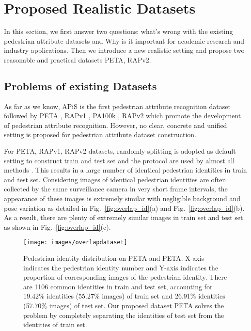 \documentclass[runningheads]{llncs}
\begin{document}
\section{Proposed Realistic Datasets} \label{dataset}

In this section, we first answer two questions: what's wrong with the existing pedestrian attribute datasets and Why is it important for academic research and industry applications. Then we introduce a new realistic setting and propose two reasonable and practical datasets PETA\textsubscript{}, RAPv2\textsubscript{}.

\subsection{Problems of existing Datasets}

As far as we know, APiS \cite{zhu2013pedestrian} is the first pedestrian attribute recognition dataset followed by PETA \cite{deng2014pedestrian}, RAPv1 \cite{li2016richly}, PA100k \cite{liu2017hydraplus}, RAPv2 \cite{li2018richly} which promote the development of pedestrian attribute recognition. However, no clear, concrete and unified setting is proposed for pedestrian attribute dataset construction. 

For PETA, RAPv1, RAPv2 datasets, randomly splitting is adopted as default setting to construct train and test set and the protocol are used by almost all methods \cite{li2016richly,liu2017hydraplus,wang2017attribute,li2018richly,sarafianos2018deep,guo2019visual,tang2019Improving}. This results in a large number of identical pedestrian identities in train and test set.
Considering images of identical pedestrian identities are often collected by the same surveillance camera in very short frame intervals, the appearance of these images is extremely similar with negligible background and pose variation as detailed in Fig.~\ref{fig:overlap_id}(a) and Fig.~\ref{fig:overlap_id}(b).
As a result, there are plenty of extremely similar images in train set and test set as shown in Fig.~\ref{fig:overlap_id}(c).

\begin{figure}[h]
\centering
\texttt{[image: images/overlapdataset]}
\caption{Pedestrian identity distribution on PETA and PETA\textsubscript{}. X-axis indicates the pedestrian identity number and Y-axis indicates the proportion of corresponding images of the pedestrian identity. There are 1106 common identities in train and test set, accounting for 19.42\% identities (55.27\% images) of train set and 26.91\% identities (57.70\% images) of test set. Our proposed dataset PETA\textsubscript{} solves the problem by completely separating the identities of test set from the identities of train set.}
\label{fig:overlap_dataset}
\end{figure}
\end{document}

